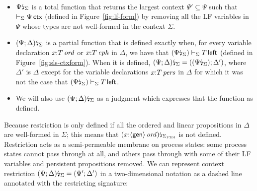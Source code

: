 \bigskip
\begin{definition}[Restriction]~
\begin{itemize}
\item
  ${\Psi}{\mbox{\lightning}}_{\Sigma}$ is a total function that returns the
  largest context $\Psi' \subseteq \Psi$ such that $\vdash_\Sigma
  \Psi\,{\sf ctx}$ (defined in Figure~\ref{fig:lf-form}) by removing
  all the LF variables in $\Psi$ whose types are not well-formed in
  the context $\Sigma$.

\item
  ${(\Psi; \Delta)}{\mbox{\lightning}}_{\Sigma}$ is a partial function that is
  defined exactly when, for every variable declaration
  $x{:}{T}\,{{\it ord}}$ or $x{:}{T}\,{{\it eph}}$ in $\Delta$, we have that
  $({\Psi}{\mbox{\lightning}}_{\Sigma}) \vdash_\Sigma T\,{\sf left}$ (defined
  in Figure~\ref{fig:sls-ctxform}). When it is defined,
  ${(\Psi; \Delta)}{\mbox{\lightning}}_{\Sigma} = (({\Psi}{\mbox{\lightning}}_{\Sigma});
  \Delta')$, where $\Delta'$ is $\Delta$ except for the variable
  declarations $x{:}{T}\,{{\it pers}}$ in $\Delta$ for which it was not the
  case that $({\Psi}{\mbox{\lightning}}_{\Sigma}) \vdash_\Sigma T\,{\sf
    left}$.

\item
  We will also use ${(\Psi; \Delta)}{\mbox{\lightning}}_{\Sigma}$ as a
  judgment which expresses that the function as defined.

\end{itemize}
\end{definition}
\bigskip

Because 
restriction is only defined if
all the ordered and linear propositions in $\Delta$ are well-formed
in $\Sigma$; this means that ${(x{:}{\langle {\sf
      gen} \rangle}\,{{\it ord}})}{\mbox{\lightning}}_{\Sigma_{\it PDA}}$ is not defined.
Restriction acts as a semi-permeable membrane on process states: some
process states cannot pass through at all, and others pass through
with some of their LF variables and persistent propositions
removed. We can represent context restriction ${(\Psi;
  \Delta)}{\mbox{\lightning}}_{\Sigma} = (\Psi'; \Delta')$ in a two-dimensional notation
as a dashed line annotated with the restricting signature:
\begin{center}
\end{center}

